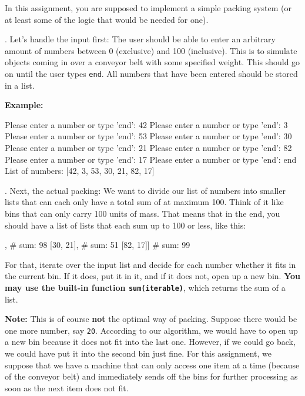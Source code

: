 In this assignment, you are supposed to implement a simple packing system (or at least some of the logic that would be needed for one).

\vspace{1em}

. Let's handle the input first: The user should be able to enter an arbitrary amount of numbers between 0 (exclusive) and 100 (inclusive). This is to simulate objects coming in over a conveyor belt with some specified weight. This should go on until the user types \texttt{end}. All numbers that have been entered should be stored in a list.

\vspace{1em}

\noindent \textbf{Example:}

\begin{outputcode}
Please enter a number or type 'end': 42
Please enter a number or type 'end': 3
Please enter a number or type 'end': 53
Please enter a number or type 'end': 30
Please enter a number or type 'end': 21
Please enter a number or type 'end': 82
Please enter a number or type 'end': 17
Please enter a number or type 'end': end
List of numbers: [42, 3, 53, 30, 21, 82, 17]
\end{outputcode}

. Next, the actual packing: We want to divide our list of numbers into smaller lists that can each only have a total sum of at maximum 100. Think of it like bins that can only carry 100 units of mass. That means that in the end, you should have a list of lists that each sum up to 100 or less, like this:

\begin{pythoncode}
[[42, 3, 53],   # sum: 98
 [30, 21],      # sum: 51
 [82, 17]]      # sum: 99
\end{pythoncode}

\noindent For that, iterate over the input list and decide for each number whether it fits in the current bin. If it does, put it in it, and if it does not, open up a new bin. \textbf{You may use the built-in function \texttt{sum(iterable)}}, which returns the sum of a list.

\vspace{1em}

\noindent \textbf{Note:} This is of course \textbf{not} the optimal way of packing. Suppose there would be one more number, say \texttt{20}. According to our algorithm, we would have to open up a new bin because it does not fit into the last one. However, if we could go back, we could have put it into the second bin just fine. For this assignment, we suppose that we have a machine that can only access one item at a time (because of the conveyor belt) and immediately sends off the bins for further processing as soon as the next item does not fit.

